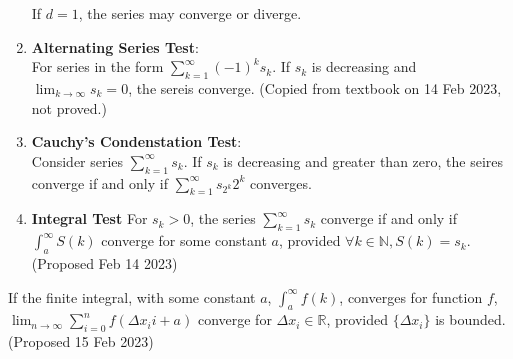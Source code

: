 \documentclass[../note.tex]{subfiles}
\begin{document}
\begin{theorem}
\begin{enumerate}
		If $d=1$, the series may converge or diverge.
	\item \textbf{Alternating Series Test}:\\
		For series in the form $\sum^{\infty}_{k=1}(-1)^{k}s_k$. If $s_k$ is decreasing and $\lim_{k\to \infty} s_k = 0$, the sereis converge. (Copied from textbook on 14 Feb 2023, not proved.)
	\item \label{Cauchy_Condensation_Test} \textbf{Cauchy's Condenstation Test}:\\
		Consider series $\sum^{\infty}_{k=1}s_k$. If ${s_k}$ is decreasing and greater than zero, the seires converge if and only if $\sum^{\infty}_{k=1}s_{2^k}2^k $ converges. 
	\item \textbf{Integral Test}\label{IntegralTest}
		For $s_k>0$, the series $\sum^{\infty}_{k=1}s_k$ converge if and only if $\int_{a}^{\infty}S(k)$ converge for some constant $a$, provided $\forall k \in \mathbb{N}, S(k)=s_k$.
		(Proposed Feb 14 2023)

\end{enumerate}
\end{theorem}

\begin{hypothesis}
	If the finite integral, with some constant $a$, $\int_{a}^{\infty}f(k)$, converges for function $f$, $\lim_{n \to \infty}\sum^{n}_{i=0} f(\Delta x_ii + a)$ converge for $\Delta x_i \in \mathbb{R}$, provided $\{\Delta x_i\}$ is bounded. (Proposed 15 Feb 2023)
\end{hypothesis}
\end{document}
